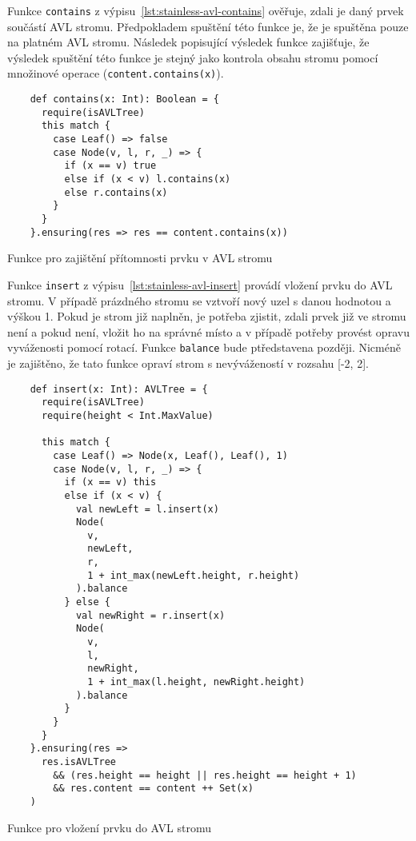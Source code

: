 Funkce \texttt{contains} z výpisu~\ref{lst:stainless-avl-contains}
ověřuje, zdali je daný prvek součástí AVL stromu.
Předpokladem spuštění této funkce je, že je spuštěna pouze na platném AVL stromu.
Následek popisující výsledek funkce zajišťuje,
že výsledek spuštění této funkce je stejný jako kontrola obsahu stromu pomocí množinové operace (\texttt{content.contains(x)}).

\begin{listing}[H]
  \begin{verbatim}
    def contains(x: Int): Boolean = {
      require(isAVLTree)
      this match {
        case Leaf() => false
        case Node(v, l, r, _) => {
          if (x == v) true
          else if (x < v) l.contains(x)
          else r.contains(x)
        }
      }
    }.ensuring(res => res == content.contains(x))
  \end{verbatim}
  \caption{Funkce pro zajištění přítomnosti prvku v AVL stromu}
  \label{lst:stainless-avl-contains}
\end{listing}

Funkce \texttt{insert} z výpisu~\ref{lst:stainless-avl-insert}
provádí vložení prvku do AVL stromu.
V případě prázdného stromu se vztvoří nový uzel s danou hodnotou a výškou 1.
Pokud je strom již naplněn,
je potřeba zjistit, zdali prvek již ve stromu není a pokud není,
vložit ho na správné místo a v případě potřeby provést opravu vyváženosti pomocí rotací.
Funkce \texttt{balance} bude ptředstavena později.
Nicméně je zajištěno, že tato funkce opraví strom s nevývážeností v rozsahu [-2, 2].

\begin{listing}[H]
  \begin{verbatim}
    def insert(x: Int): AVLTree = {
      require(isAVLTree)
      require(height < Int.MaxValue)

      this match {
        case Leaf() => Node(x, Leaf(), Leaf(), 1)
        case Node(v, l, r, _) => {
          if (x == v) this
          else if (x < v) {
            val newLeft = l.insert(x)
            Node(
              v,
              newLeft,
              r,
              1 + int_max(newLeft.height, r.height)
            ).balance
          } else {
            val newRight = r.insert(x)
            Node(
              v,
              l,
              newRight,
              1 + int_max(l.height, newRight.height)
            ).balance
          }
        }
      }
    }.ensuring(res =>
      res.isAVLTree
        && (res.height == height || res.height == height + 1)
        && res.content == content ++ Set(x)
    )
  \end{verbatim}
  \caption{Funkce pro vložení prvku do AVL stromu}
  \label{lst:stainless-avl-insert}
\end{listing}

